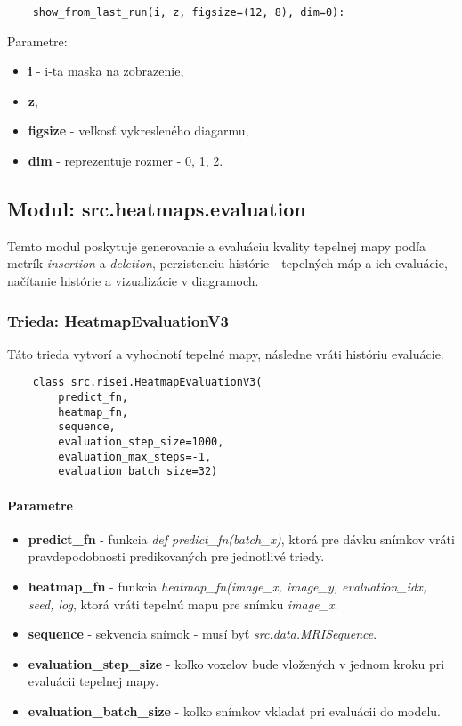 \vspace{32pt}
\begin{lstlisting}
    show_from_last_run(i, z, figsize=(12, 8), dim=0):
\end{lstlisting}

Parametre:
\begin{itemize}
    \item \textbf{i} - i-ta maska na zobrazenie,
    \item \textbf{z},
    \item \textbf{figsize} - veľkosť vykresleného diagarmu,
    \item \textbf{dim} - reprezentuje rozmer - 0, 1, 2.
\end{itemize}

\subsection{Modul: src.heatmaps.evaluation}

Temto modul poskytuje generovanie a evaluáciu kvality tepelnej mapy podľa metrík \textit{insertion} a \textit{deletion}, perzistenciu histórie - tepelných máp a ich evaluácie, načítanie histórie a vizualizácie v diagramoch.

\subsubsection{Trieda: HeatmapEvaluationV3}

Táto trieda vytvorí a vyhodnotí tepelné mapy, následne vráti históriu evaluácie.

\begin{lstlisting}
    class src.risei.HeatmapEvaluationV3(
        predict_fn,
        heatmap_fn,
        sequence,
        evaluation_step_size=1000,
        evaluation_max_steps=-1,
        evaluation_batch_size=32)
\end{lstlisting}

\paragraph{Parametre}

\begin{itemize}
    \item \textbf{predict\_fn} - funkcia \textit{def predict\_fn(batch\_x)}, ktorá pre dávku snímkov vráti pravdepodobnosti predikovaných pre jednotlivé triedy.
    \item \textbf{heatmap\_fn} - funkcia \textit{heatmap\_fn(image\_x, image\_y, evaluation\_idx, seed, log}, ktorá vráti tepelnú mapu pre snímku \textit{image\_x}.
    \item \textbf{sequence} - sekvencia snímok - musí byť \textit{src.data.MRISequence}.
    \item \textbf{evaluation\_step\_size} - koľko voxelov bude vložených v jednom kroku pri evaluácii tepelnej mapy. 
    \item \textbf{evaluation\_batch\_size} - koľko snímkov vkladať pri evaluácii do modelu.
\end{itemize}

